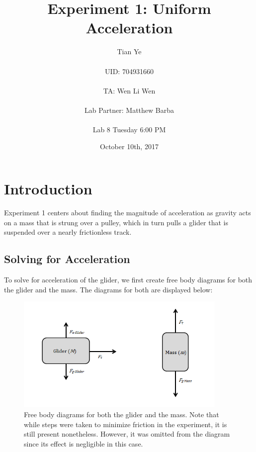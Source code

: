 \documentclass[titlepage]{article}
\begin{document}
\title{Experiment 1: Uniform Acceleration}
\author{Tian Ye \\ \\ UID: 704931660 \\ \\ TA: Wen Li Wen \\ \\ Lab Partner: Matthew Barba \\ \\ Lab 8 Tuesday 6:00 PM}
\date{October 10th, 2017}

\maketitle

\section{Introduction}
Experiment 1 centers about finding the magnitude of acceleration as gravity acts on a mass that is strung over a pulley, which in turn pulls a glider that is suspended over a nearly frictionless track.

\subsection{Solving for Acceleration}
To solve for acceleration of the glider, we first create free body diagrams for both the glider and the mass. The diagrams for both are displayed below:

\begin{figure}[!htbp]
    \centering
    \includegraphics[width=4.0in]{FreeBody.png}
    \caption{Free body diagrams for both the glider and the mass. Note that while steps were taken to minimize friction in the experiment, it is still present nonetheless. However, it was omitted from the diagram since its effect is negligible in this case.}
\end{figure}
\end{document}
